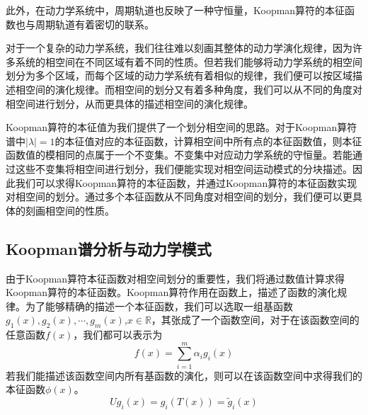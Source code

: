 此外，在动力学系统中，周期轨道也反映了一种守恒量，Koopman算符的本征函数也与周期轨道有着密切的联系。

对于一个复杂的动力学系统，我们往往难以刻画其整体的动力学演化规律，因为许多系统的相空间在不同区域有着不同的性质。但若我们能够将动力学系统的相空间划分为多个区域，而每个区域的动力学系统有着相似的规律，我们便可以按区域描述相空间的演化规律。而相空间的划分又有着多种角度，我们可以从不同的角度对相空间进行划分，从而更具体的描述相空间的演化规律。

Koopman算符的本征值为我们提供了一个划分相空间的思路。对于Koopman算符谱中$|\lambda|=1$的本征值对应的本征函数，计算相空间中所有点的本征函数值，则本征函数值的模相同的点属于一个不变集。不变集中对应动力学系统的守恒量。若能通过这些不变集将相空间进行划分，我们便能实现对相空间运动模式的分块描述。因此我们可以求得Koopman算符的本征函数，并通过Koopman算符的本征函数实现对相空间的划分。通过多个本征函数从不同角度对相空间的划分，我们便可以更具体的刻画相空间的性质。


\subsection{Koopman谱分析与动力学模式}\label{section:Koop_dyna}

由于Koopman算符本征函数对相空间划分的重要性，我们将通过数值计算求得Koopman算符的本征函数。Koopman算符作用在函数上，描述了函数的演化规律。为了能够精确的描述一个本征函数，我们可以选取一组基函数$g_1(x),g_2(x),\cdots,g_m(x)$,$x\in \mathbb{R}$，其张成了一个函数空间，对于在该函数空间的任意函数$f(x)$，我们都可以表示为
\begin{equation}
    f(x)=\sum_{i=1}^m\alpha_ig_i(x)
\end{equation}
若我们能描述该函数空间内所有基函数的演化，则可以在该函数空间中求得我们的本征函数$\phi(x)$。
\begin{equation}
    Ug_i(x)=g_i(T(x))=\tilde{g}_i(x)
\end{equation}

